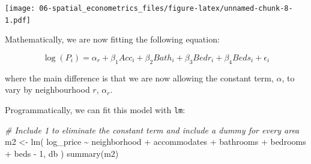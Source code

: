 \documentclass[
]{book}
\newenvironment{Shaded}{\begin{snugshade}}{\end{snugshade}}
\newcommand{\CommentTok}[1]{\textcolor[rgb]{0.56,0.35,0.01}{\textit{#1}}}
\newcommand{\FunctionTok}[1]{\textcolor[rgb]{0.00,0.00,0.00}{#1}}
\newcommand{\NormalTok}[1]{#1}
\newcommand{\OtherTok}[1]{\textcolor[rgb]{0.56,0.35,0.01}{#1}}
\newcommand{\StringTok}[1]{\textcolor[rgb]{0.31,0.60,0.02}{#1}}
\begin{document}
\texttt{[image: 06-spatial\_econometrics\_files/figure-latex/unnamed-chunk-8-1.pdf]}

Mathematically, we are now fitting the following equation:

\[
\log(P_i) = \alpha_r + \beta_1 Acc_i + \beta_2 Bath_i + \beta_3 Bedr_i + \beta_4 Beds_i + \epsilon_i
\]

where the main difference is that we are now allowing the constant term, \(\alpha\), to vary by neighbourhood \(r\), \(\alpha_r\).

Programmatically, we can fit this model with \texttt{lm}:

\begin{Shaded}
\begin{Highlighting}[]
\CommentTok{\# Include \textasciigrave{}{-}1\textasciigrave{} to eliminate the constant term and include a dummy for every area}
\NormalTok{m2 }\OtherTok{\textless{}{-}} \FunctionTok{lm}\NormalTok{(}
  \StringTok{\textquotesingle{}log\_price \textasciitilde{} neighborhood + accommodates + bathrooms + bedrooms + beds {-} 1\textquotesingle{}}\NormalTok{, }
\NormalTok{  db}
\NormalTok{)}
\FunctionTok{summary}\NormalTok{(m2)}
\end{Highlighting}
\end{Shaded}
\end{document}
